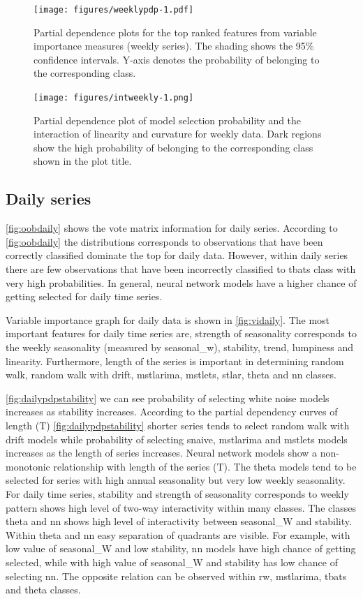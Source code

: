 \documentclass[11pt,a4paper,]{article}
\begin{document}
\begin{figure}
\centering
\texttt{[image: figures/weeklypdp-1.pdf]}
\caption{\label{fig:weeklypdp}Partial dependence plots for the top ranked features from variable importance measures (weekly series). The shading shows the 95\% confidence intervals. Y-axis denotes the probability of belonging to the corresponding class.}
\end{figure}

\begin{figure}
\centering
\texttt{[image: figures/intweekly-1.png]}
\caption{\label{fig:intweekly}Partial dependence plot of model selection probability and the interaction of linearity and curvature for weekly data. Dark regions show the high probability of belonging to the corresponding class shown in the plot title.}
\end{figure}

\hypertarget{daily-series}{%
\subsection{Daily series}\label{daily-series}}

\autoref{fig:oobdaily} shows the vote matrix information for daily series. According to \autoref{fig:oobdaily} the distributions corresponds to observations that have been correctly classified dominate the top for daily data. However, within daily series there are few observations that have been incorrectly classified to tbats class with very high probabilities. In general, neural network models have a higher chance of getting selected for daily time series.

Variable importance graph for daily data is shown in \autoref{fig:vidaily}. The most important features for daily time series are, strength of seasonality corresponds to the weekly seasonality (measured by seasonal\_w), stability, trend, lumpiness and linearity. Furthermore, length of the series is important in determining random walk, random walk with drift, mstlarima, mstlets, stlar, theta and nn classes.

\autoref{fig:dailypdpstability} we can see probability of selecting white noise models increases as stability increases. According to the partial dependency curves of length (T)
\autoref{fig:dailypdpstability} shorter series tends to select random walk with drift models while probability of selecting snaive, mstlarima and mstlets models increases as the length of series increases. Neural network models show a non-monotonic relationship with length of the series (T). The theta models tend to be selected for series with high annual seasonality but very low weekly seasonality. For daily time series, stability and strength of seasonality corresponds to weekly pattern shows high level of two-way interactivity within many classes. The classes theta and nn shows high level of interactivity between seasonal\_W and stability. Within theta and nn easy separation of quadrants are visible. For example, with low value of seasonal\_W and low stability, nn models have high chance of getting selected, while with high value of seasonal\_W and stability has low chance of selecting nn. The opposite relation can be observed within rw, mstlarima, tbats and theta classes.
\end{document}
